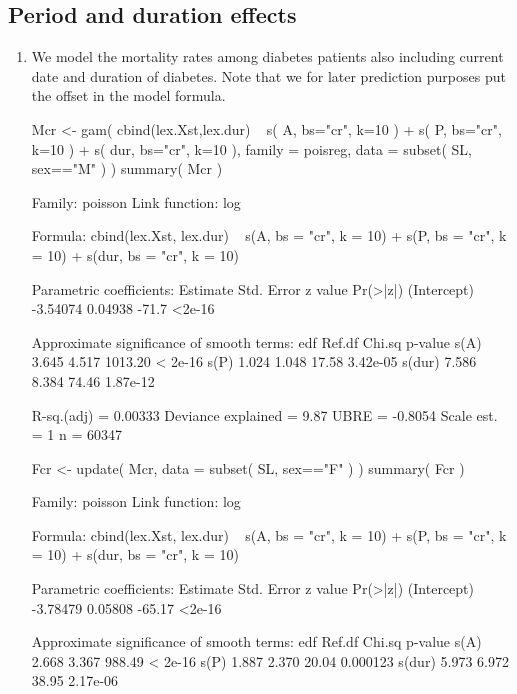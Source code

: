 \subsection*{Period and duration effects}

\begin{enumerate}[resume]

  
\item We model the mortality rates among diabetes patients also
  including current date and duration of diabetes. Note that we for
  later prediction purposes put the offset in the model formula.
\begin{Schunk}
\begin{Sinput}
 Mcr <- gam( cbind(lex.Xst,lex.dur) ~ s(   A, bs="cr", k=10 ) +
                                      s(   P, bs="cr", k=10 ) +
                                      s( dur, bs="cr", k=10 ),
             family = poisreg,
               data = subset( SL, sex=="M" ) )
 summary( Mcr )
\end{Sinput}
\begin{Soutput}
Family: poisson 
Link function: log 

Formula:
cbind(lex.Xst, lex.dur) ~ s(A, bs = "cr", k = 10) + s(P, bs = "cr", 
    k = 10) + s(dur, bs = "cr", k = 10)

Parametric coefficients:
            Estimate Std. Error z value Pr(>|z|)
(Intercept) -3.54074    0.04938   -71.7   <2e-16

Approximate significance of smooth terms:
         edf Ref.df  Chi.sq  p-value
s(A)   3.645  4.517 1013.20  < 2e-16
s(P)   1.024  1.048   17.58 3.42e-05
s(dur) 7.586  8.384   74.46 1.87e-12

R-sq.(adj) =  0.00333   Deviance explained = 9.87%
UBRE = -0.8054  Scale est. = 1         n = 60347
\end{Soutput}
\begin{Sinput}
 Fcr <- update( Mcr, data = subset( SL, sex=="F" ) )
 summary( Fcr )
\end{Sinput}
\begin{Soutput}
Family: poisson 
Link function: log 

Formula:
cbind(lex.Xst, lex.dur) ~ s(A, bs = "cr", k = 10) + s(P, bs = "cr", 
    k = 10) + s(dur, bs = "cr", k = 10)

Parametric coefficients:
            Estimate Std. Error z value Pr(>|z|)
(Intercept) -3.78479    0.05808  -65.17   <2e-16

Approximate significance of smooth terms:
         edf Ref.df Chi.sq  p-value
s(A)   2.668  3.367 988.49  < 2e-16
s(P)   1.887  2.370  20.04 0.000123
s(dur) 5.973  6.972  38.95 2.17e-06


\end{Soutput}
\end{Schunk}
\end{enumerate}
